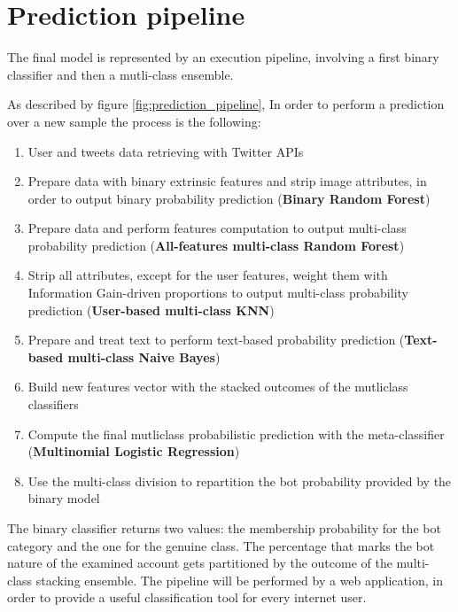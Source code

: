\section{Prediction pipeline}
\label{predicion_pipeline}
The final model is represented by an execution pipeline, involving a first binary classifier and then a mutli-class ensemble.

As described by figure \ref{fig:prediction_pipeline}, In order to perform a prediction over a new sample the process is the following:
\begin{enumerate}
	\item User and tweets data retrieving with Twitter APIs
	\item Prepare data with binary extrinsic features and strip image attributes, in order to output binary probability prediction (\textbf{Binary Random Forest})
	\item Prepare data and perform features computation to output multi-class probability prediction (\textbf{All-features multi-class Random Forest})
	\item Strip all attributes, except for the user features, weight them with Information Gain-driven proportions to output multi-class probability prediction (\textbf{User-based multi-class KNN})
	\item Prepare and treat text to perform text-based probability prediction (\textbf{Text-based multi-class Naive Bayes})
	\item Build new features vector with the stacked outcomes of the mutliclass classifiers
	\item Compute the final mutliclass probabilistic prediction with the meta-classifier (\textbf{Multinomial Logistic Regression})
	\item Use the multi-class division to repartition the bot probability provided by the binary model
\end{enumerate}
The binary classifier returns two values: the membership probability for the bot category and the one for the genuine class.
The percentage that marks the bot nature of the examined account gets partitioned by the outcome of the multi-class stacking ensemble.
The pipeline will be performed by a web application, in order to provide a useful classification tool for every internet user.

